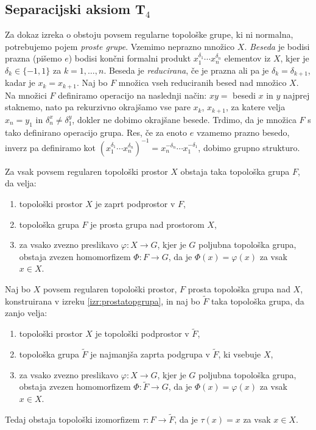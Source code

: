 \documentclass[mat1]{fmfdelo}
\begin{document}
\subsection{Separacijski aksiom T$_4$}
Za dokaz izreka o obstoju povsem regularne topološke grupe, ki ni normalna, potrebujemo pojem \emph{proste grupe}. Vzemimo neprazno množico $X$. \emph{Beseda} je bodisi prazna (pišemo $e$) bodisi končni formalni produkt $x_1^{\delta_1}\cdots x_n^{\delta_n}$ elementov iz $X$, kjer je $\delta_k \in \lbrace -1, 1\rbrace$ za $k = 1,\dots,n$. Beseda je \emph{reducirana}, če je prazna ali pa je $\delta_k = \delta_{k+1}$, kadar je $x_k = x_{k+1}$. Naj bo $F$ množica vseh reduciranih besed nad množico $X$. Na množici $F$ definiramo operacijo na naslednji način: $xy = $ besedi $x$ in $y$ najprej staknemo, nato pa rekurzivno okrajšamo vse pare $x_k$, $x_{k+1}$, za katere velja $x_n = y_1$ in $\delta_n^x \neq \delta_1^y$, dokler ne dobimo okrajšane besede. Trdimo, da je množica $F$ s tako definirano operacijo grupa. Res, če za enoto $e$ vzamemo prazno besedo, inverz pa definiramo kot $(x_1^{\delta_1}\cdots x_n^{\delta_n})^{-1} = x_n^{-\delta_n}\cdots x_1^{-\delta_1}$, dobimo grupno strukturo.

\begin{izrek}\label{izr:prostatopgrupa}
Za vsak povsem regularen topološki prostor $X$ obstaja taka topološka grupa $F$, da velja:
\begin{enumerate}
	\item topološki prostor $X$ je zaprt podprostor v $F$,
	\item topološka grupa $F$ je prosta grupa nad prostorom $X$,
	\item za vsako zvezno preslikavo $\varphi\colon X \to G$, kjer je $G$ poljubna topološka grupa, obstaja zvezen homomorfizem $\Phi\colon F \to G$, da je $\Phi(x) = \varphi(x)$ za vsak $x \in X$.
\end{enumerate}
\end{izrek}

\begin{izrek}\label{izr:prostaizo}
Naj bo $X$ povsem regularen topološki prostor, $F$ prosta topološka grupa nad $X$, konstruirana v izreku \ref{izr:prostatopgrupa}, in naj bo $\widetilde{F}$ taka topološka grupa, da zanjo velja:
\begin{enumerate}
	\item topološki prostor $X$ je topološki podprostor v $\widetilde{F}$,
	\item topološka grupa $\widetilde{F}$ je najmanjša zaprta podgrupa v $\widetilde{F}$, ki vsebuje $X$,
	\item za vsako zvezno preslikavo $\varphi\colon X \to G$, kjer je $G$ poljubna topološka grupa, obstaja zvezen homomorfizem $\Phi\colon \widetilde{F} \to G$, da je $\Phi(x) = \varphi(x)$ za vsak $x \in X$.
\end{enumerate}
Tedaj obstaja topološki izomorfizem $\tau\colon F \to \widetilde{F}$, da je $\tau(x) = x$ za vsak $x \in X$.
\end{izrek}
\end{document}

